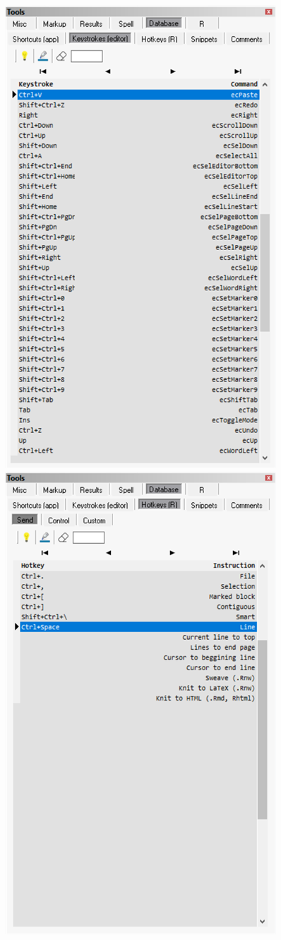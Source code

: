 \begin{figure}[H]
  \includegraphics[scale=0.45]{./res/tools_database_keystrokes.png}~~
  \includegraphics[scale=0.45]{./res/tools_database_rh_send.png}\\

\end{figure}
